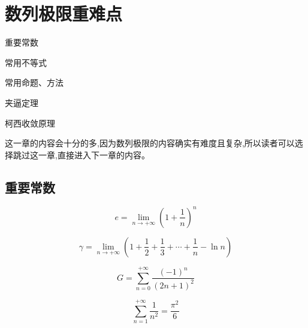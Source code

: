 \documentclass[lang=cn,10pt,twoside]{elegantbook}
\begin{document}
\chapter{数列极限重难点}
\begin{introduction}
  \item 重要常数
  \item 常用不等式
  \item 常用命题、方法
  \item 夹逼定理
  \item 柯西收敛原理
\end{introduction}

这一章的内容会十分的多,因为数列极限的内容确实有难度且复杂,所以读者可以选择跳过这一章,直接进入下一章的内容。

\section{重要常数}
\begin{definition}[自然常数]
  \begin{equation*}
    e = \lim_{n \rightarrow +\infty} \left(1+\frac 1n\right)^n
  \end{equation*}
\end{definition}
\begin{definition}[欧拉常数]
  \begin{equation*}
    \gamma = \lim_{n \rightarrow +\infty} \left(1+\frac 12 + \frac 13 + \cdots + \frac 1n - \ln n\right)
  \end{equation*}
\end{definition}
\begin{definition}[Catalan 常数]
  \begin{equation*}
    G = \sum_{n=0}^{+\infty} \frac{(-1)^n}{(2n+1)^2}
  \end{equation*}
\end{definition}
\begin{definition}[Basel 问题]
  \begin{equation*}
    \sum_{n=1}^{+\infty} \frac{1}{n^2} = \frac{\pi ^2}{6}
  \end{equation*}
\end{definition}
\end{document}
